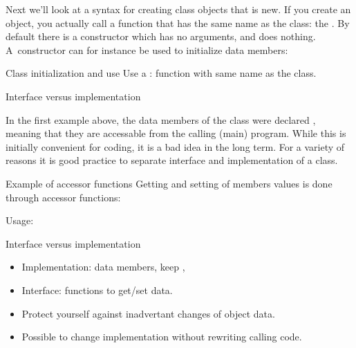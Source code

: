 Next we'll look at a syntax for creating class objects that is new. If
you create an object, you actually call a function that has the same
name as the class: the . By default there is a
constructor which has no arguments, and does nothing. A~constructor
can for instance be used to initialize data members:
%

\begin{slide}{Class initialization and use}
  \label{sl:class-construct}
  Use a : function with same name as the class.
\end{slide}

 {Interface versus implementation}

In the first example above, the data members of the  class were
declared , meaning that they are accessable from the calling
(main) program. While this is initially convenient for coding, it is a bad idea
in the long term. For a variety of reasons it is good practice to
separate interface and implementation of a class.

\begin{block}{Example of accessor functions}
  \label{sl:pointaccess}
  Getting and setting of members values is done through accessor functions:
  \begin{multicols}{2}
  \end{multicols}
  Usage:
  \begin{multicols}{2}
  \end{multicols}
\end{block}

\begin{block}{Interface versus implementation}
  \label{sl:interfaceimpl}
  \begin{itemize}
  \item Implementation: data members, keep ,
  \item Interface:  functions to get/set data.
  \item Protect yourself against inadvertant changes of object data.
  \item Possible to change implementation without rewriting calling code.
  \end{itemize}
\end{block}

